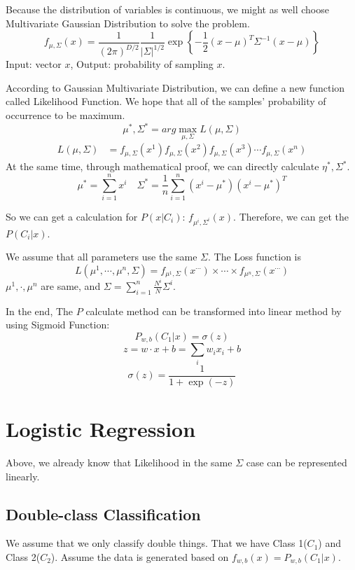 \documentclass{article}
\newenvironment{propblock}[1][\textbf{Proposition}]{\begin{tcolorbox}
[title = \textbf{#1}, colback=Salmon!20, colframe=Salmon!90!Black]}{\end{tcolorbox}}
\begin{document}
Because the distribution of variables is continuous, we might as well choose Multivariate Gaussian Distribution to solve the problem.
$$
f_{\mu,\Sigma}(x)=\frac1{(2\pi)^{D/2}}\frac1{|\Sigma|^{1/2}}\exp\left\{-\frac12(x-\mu)^T\Sigma^{-1}(x-\mu)\right\}
$$
Input: vector $x$, Output: probability of sampling $x$. 

According to Gaussian Multivariate Distribution, we can define a new function called Likelihood Function. We hope that all of the samples' probability of occurrence to be maximum.
$$
\mu^*,\Sigma^*=arg\max_{\mu,\Sigma}L(\mu,\Sigma)
$$
$$
\begin{aligned}L(\mu,\Sigma)&=f_{\mu,\Sigma}(x^1)f_{\mu,\Sigma}(x^2)f_{\mu,\Sigma}(x^3)\cdots f_{\mu,\Sigma}(x^{n})\end{aligned}
$$
At the same time, through mathematical proof, we can directly calculate $\eta^*,\Sigma^*$.
$$
\mu^* = \sum_{i=1}^n x^i\quad \Sigma^* = \frac{1}{n}\sum_{i=1}^n(x^i-\mu^*)(x^i-\mu^*)^T
$$

So we can get a calculation for $P(x|C_i)$: $f_{\mu^i,\Sigma^i}(x)$. Therefore, we can get the $P(C_i|x)$.

\begin{propblock}[How To Modifying Model]
    We assume that all parameters use the same $\Sigma$. The Loss function is 
    $$
    L(\mu^1,\cdots,\mu^n,\Sigma) = f_{\mu^1,\Sigma}(x^{\cdots})\times\cdots\times f_{\mu^n,\Sigma}(x^{\cdots})
    $$
    $\mu^1,\cdot,\mu^n$ are same, and $\Sigma = \sum_{i=1}^{n}\frac{N^i}{N}\Sigma^i$.
    
    In the end, The $P$ calculate method can be transformed into linear method by using Sigmoid Function:
    $$
    P_{w,b}(C_1|x) = \sigma(z)
    $$
    $$
    z = w \cdot x + b = \sum_{i} w_ix_i + b
    $$
    $$
    \sigma (z) = \frac{1}{1+\exp({-z})}
    $$
\end{propblock}

\section{Logistic Regression}

Above, we already know that Likelihood in the same $\Sigma$ case can be represented linearly. 

\subsection{Double-class Classification}

We assume that we only classify double things. That we have Class 1($C_1$) and Class 2($C_2$). Assume the data is generated based on $f_{w,b}(x) = P_{w,b}(C_1|x)$.
\end{document}
